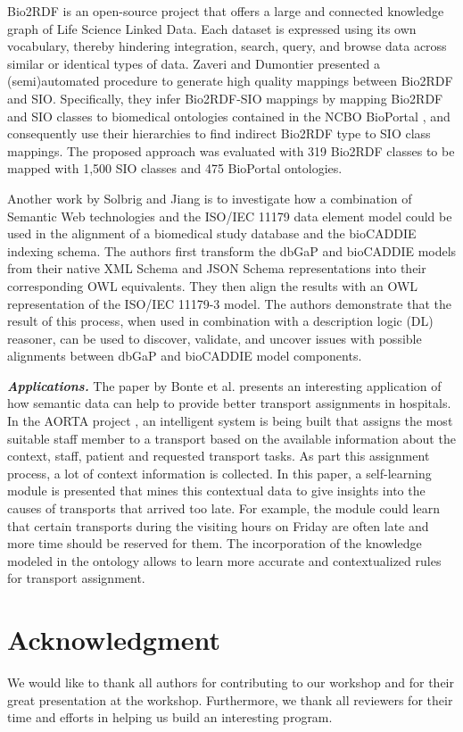 \documentclass[runningheads,a4paper]{llncs}
\begin{document}
Bio2RDF is an open-source project that offers a large and connected knowledge graph of Life Science Linked Data. Each dataset is expressed using its own vocabulary, thereby hindering integration, search, query, and browse data across similar or identical types of data. Zaveri and Dumontier presented a (semi)automated procedure to generate high quality mappings between Bio2RDF and SIO. Specifically, they infer Bio2RDF-SIO mappings by mapping Bio2RDF and SIO classes to biomedical ontologies contained in the NCBO BioPortal \cite{DBLP:journals/nar/WhetzelNSANTM11}, and consequently use their hierarchies to find indirect Bio2RDF type to SIO class mappings. The proposed approach was evaluated with 319 Bio2RDF classes to be mapped with 1,500 SIO classes and 475 BioPortal ontologies.

Another work by Solbrig and Jiang is to investigate how a combination of Semantic Web technologies and the ISO/IEC 11179 data element model could be used in the alignment of a biomedical study database and the bioCADDIE indexing schema. The authors first transform the dbGaP and bioCADDIE models from their native XML Schema and JSON Schema representations into their corresponding OWL equivalents. They then align the results with an OWL representation of the ISO/IEC 11179-3 model. The authors demonstrate that the result of this process, when used in combination with a description logic (DL) reasoner, can be used to discover, validate, and uncover issues with possible alignments between dbGaP and bioCADDIE model components.

\textit{\textbf{Applications.}} The paper by Bonte et al. presents an interesting application of how semantic data can help to provide better transport assignments in hospitals. In the AORTA project \cite{ongenae2016semantic}, an intelligent system is being built that assigns the most suitable staff member to a transport based on the available information about the context, staff, patient and requested transport tasks.  As part this assignment process, a lot of context information is collected. In this paper, a self-learning module is presented that mines this contextual data to give insights into the causes of transports that arrived too late. For example, the module could learn that certain transports during the visiting hours on Friday are often late and more time should be reserved for them. The incorporation of the knowledge modeled in the ontology allows to learn more accurate and contextualized rules for transport assignment.

\section*{Acknowledgment}
We would like to thank all authors for contributing to our workshop and for their great presentation at the workshop. Furthermore, we thank all reviewers for their time and efforts in helping us build an interesting program.



\end{document}
